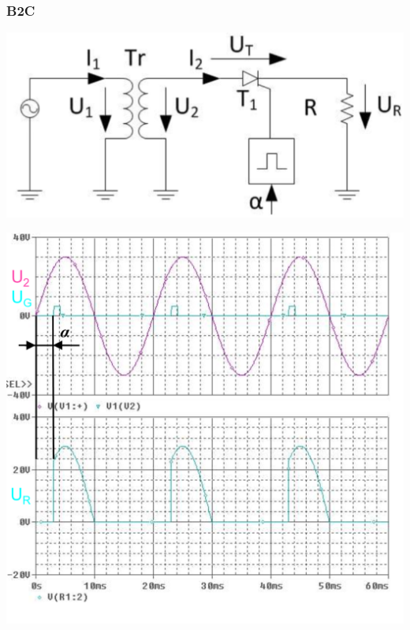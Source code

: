\subsubsection{B2C}%
\vspace{-0.5cm}
\begin{minipage}{0.4\linewidth}
    \includegraphics[width=\linewidth]{images/GRM1c}
\end{minipage}
\begin{minipage}{0.35\linewidth}
    \centering 
    \includegraphics[width=\linewidth]{images/M1CKl}
    
\end{minipage}
